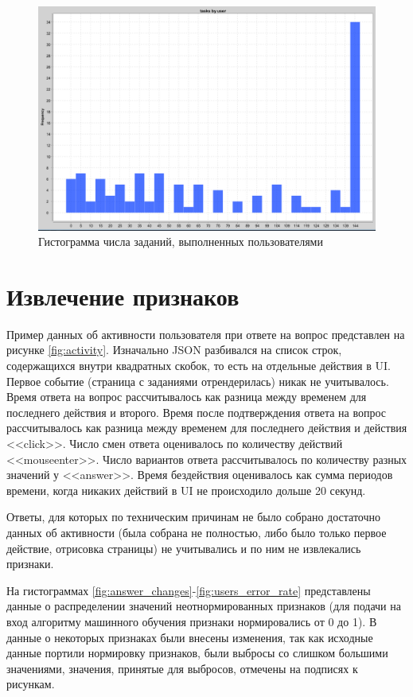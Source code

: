 \documentclass[specification,annotation,times]{itmo-student-thesis}
\begin{document}
\begin{figure}
  \includegraphics[scale=0.5]{tasks.PNG}
  \caption{Гистограмма числа заданий, выполненных пользователями}
  \label{fig:tasks}
\end{figure}

\section{Извлечение признаков}
Пример данных об активности пользователя при ответе на вопрос представлен на рисунке \ref{fig:activity}. Изначально JSON разбивался на список строк, содержащихся внутри квадратных скобок, то есть на отдельные действия в UI. Первое событие (страница с заданиями отрендерилась) никак не учитывалось. Время ответа на вопрос рассчитывалось как разница между временем для последнего действия и второго. Время после подтверждения ответа на вопрос рассчитывалось как разница между временем для последнего действия и действия <<click>>. Число смен ответа оценивалось по количеству действий <<mouseenter>>. Число вариантов ответа рассчитывалось по количеству разных значений у <<answer>>. Время бездействия оценивалось как сумма периодов времени, когда никаких действий в UI не происходило дольше 20 секунд.

Ответы, для которых по техническим причинам не было собрано достаточно данных об активности (была собрана не полностью, либо было только первое действие, отрисовка страницы) не учитывались и по ним не извлекались признаки.

На гистограммах \ref{fig:answer_changes}-\ref{fig:users_error_rate} представлены данные о распределении значений неотнормированных признаков (для подачи на вход алгоритму машинного обучения признаки нормировались от 0 до 1). В данные о некоторых признаках были внесены изменения, так как исходные данные портили нормировку признаков, были выбросы со слишком большими значениями, значения, принятые для выбросов, отмечены на подписях к рисункам. 
\end{document}
